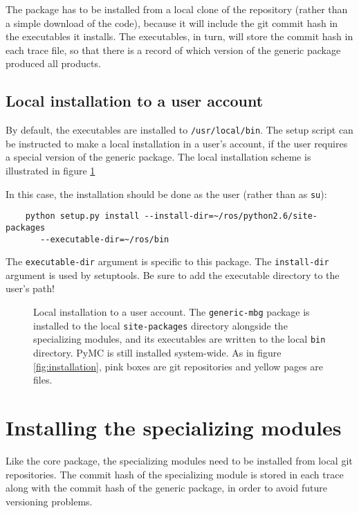 The package has to be installed from a local clone of the repository (rather than a simple download of the code), because it will include the git commit hash in the executables it installs. The executables, in turn, will store the commit hash in each trace file, so that there is a record of which version of the generic package produced all products.

\subsection{Local installation to a user account}
\label{sub:core-local} 
By default, the executables are installed to \texttt{/usr/local/bin}. The setup script can be instructed to make a local installation in a user's account, if the user requires a special version of the generic package. The local installation scheme is illustrated in figure \ref{fig:local-installation} 

In this case, the installation should be done as the user (rather than as \texttt{su}):
\begin{verbatim}
    python setup.py install --install-dir=~/ros/python2.6/site-packages
       --executable-dir=~/ros/bin 
\end{verbatim}
The \texttt{executable-dir} argument is specific to this package. The \texttt{install-dir} argument is used by setuptools. Be sure to add the executable directory to the user's path!

\begin{figure}[hhh]
    \begin{center}
    \end{center}
    \caption{Local installation to a user account. The \texttt{generic-mbg} package is installed to the local \texttt{site-packages} directory alongside the specializing modules, and its executables are written to the local \texttt{bin} directory. PyMC is still installed system-wide. As in figure \ref{fig:installation}, pink boxes are git repositories and yellow pages are files.}
    \label{fig:local-installation}
\end{figure}

\section{Installing the specializing modules}
\label{sec:spec-local} 
Like the core package, the specializing modules need to be installed from local git repositories. The commit hash of the specializing module is stored in each trace along with the commit hash of the generic package, in order to avoid future versioning problems.

